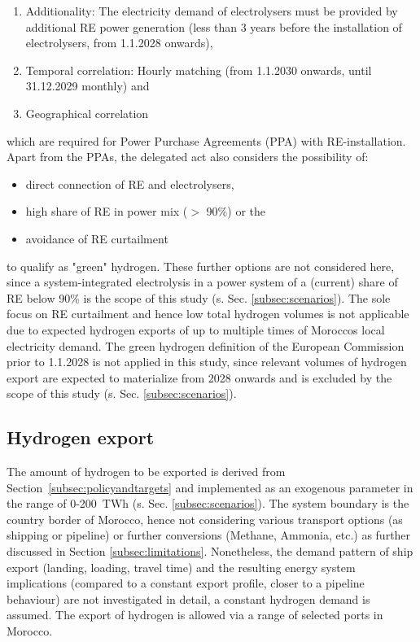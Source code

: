\begin{enumerate}
    \item Additionality: The electricity demand of electrolysers must be provided by additional RE power generation (less than 3 years before the installation of electrolysers, from 1.1.2028 onwards),
    \item Temporal correlation: Hourly matching (from 1.1.2030 onwards, until 31.12.2029 monthly) and
    \item Geographical correlation
\end{enumerate}
which are required for Power Purchase Agreements (PPA) with RE-installation. Apart from the PPAs, the delegated act also considers the possibility of:
\begin{itemize}
    \item direct connection of RE and electrolysers,
    \item high share of RE in power mix ($>$ 90\%) or the
    \item avoidance of RE curtailment
\end{itemize}
to qualify as "green" hydrogen. These further options are not considered here, since a system-integrated electrolysis in a power system of a (current) share of RE below 90\% is the scope of this study (s. Sec. \ref{subsec:scenarios}). The sole focus on RE curtailment and hence low total hydrogen volumes is not applicable due to expected hydrogen exports of up to multiple times of Moroccos local electricity demand. The green hydrogen definition of the European Commission prior to 1.1.2028 is not applied in this study, since relevant volumes of hydrogen export are expected to materialize from 2028 onwards and is excluded by the scope of this study (s. Sec. \ref{subsec:scenarios}).


\subsection{Hydrogen export}
\label{subsec:hydrogen_export}
The amount of hydrogen to be exported is derived from Section~\ref{subsec:policyandtargets} and implemented as an exogenous parameter in the range of 0-200~TWh (s. Sec. \ref{subsec:scenarios}). The system boundary is the country border of Morocco, hence not considering various transport options (as shipping or pipeline) or further conversions (Methane, Ammonia, etc.) as further discussed in Section \ref{subsec:limitations}. %
Nonetheless, the demand pattern of ship export (landing, loading, travel time) and the resulting energy system implications (compared to a constant export profile, closer to a pipeline behaviour) are not investigated in detail, a constant hydrogen demand is assumed. The export of hydrogen is allowed via a range of selected ports in Morocco.

